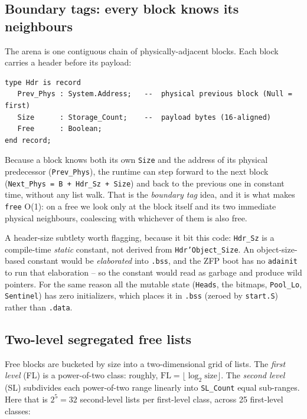 \subsection{Boundary tags: every block knows its neighbours}

The arena is one contiguous chain of physically-adjacent blocks. Each block
carries a header before its payload:

\begin{lstlisting}
type Hdr is record
   Prev_Phys : System.Address;   --  physical previous block (Null = first)
   Size      : Storage_Count;    --  payload bytes (16-aligned)
   Free      : Boolean;
end record;
\end{lstlisting}

Because a block knows both its own \texttt{Size} and the address of its physical
predecessor (\texttt{Prev\_Phys}), the runtime can step forward to the next block
(\texttt{Next\_Phys = B + Hdr\_Sz + Size}) and back to the previous one in
constant time, without any list walk. That is the \emph{boundary tag} idea, and
it is what makes \texttt{free} O(1): on a free we look only at the block itself
and its two immediate physical neighbours, coalescing with whichever of them is
also free.

A header-size subtlety worth flagging, because it bit this code: \texttt{Hdr\_Sz}
is a compile-time \emph{static} constant, not derived from
\texttt{Hdr'Object\_Size}. An object-size-based constant would be \emph{elaborated}
into \texttt{.bss}, and the ZFP boot has no \texttt{adainit} to run that
elaboration -- so the constant would read as garbage and produce wild pointers.
For the same reason all the mutable state (\texttt{Heads}, the bitmaps,
\texttt{Pool\_Lo}, \texttt{Sentinel}) has zero initializers, which places it in
\texttt{.bss} (zeroed by \texttt{start.S}) rather than \texttt{.data}.

\subsection{Two-level segregated free lists}

Free blocks are bucketed by size into a two-dimensional grid of lists. The
\emph{first level} (FL) is a power-of-two class: roughly, $\mathrm{FL} =
\lfloor\log_2 \mathrm{size}\rfloor$. The \emph{second level} (SL) subdivides each
power-of-two range linearly into \texttt{SL\_Count} equal sub-ranges. Here that is
$2^5 = 32$ second-level lists per first-level class, across 25 first-level
classes:

